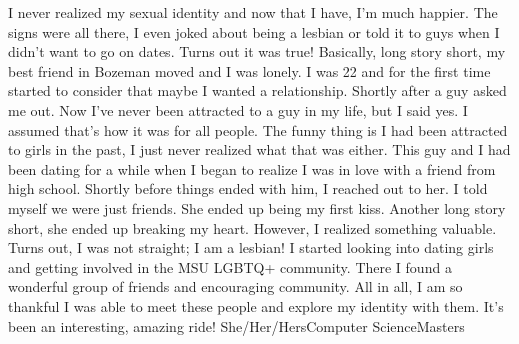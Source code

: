 {I never realized my sexual identity and now that I have, I’m much happier. 
The signs were all there, I even joked about being a lesbian or told it to 
guys when I didn’t want to go on dates. Turns out it was true! Basically, long 
story short, my best friend in Bozeman moved and I was lonely. I was 22 and for
the first time started to consider that maybe I wanted a relationship. Shortly 
after a guy asked me out. Now I’ve never been attracted to a guy in my life, 
but I said yes. I assumed that’s how it was for all people. The funny thing is 
I had been attracted to girls in the past, I just never realized what that was 
either. This guy and I had been dating for a while when I began to realize I 
was in love with a friend from high school. Shortly before things ended with 
him, I reached out to her. I told myself we were just friends. She ended up 
being my first kiss. Another long story short, she ended up breaking my heart. 
However, I realized something valuable. Turns out, I was not straight; I am a 
lesbian! I started looking into dating girls and getting involved in the MSU 
LGBTQ+ community. There I found a wonderful group of friends and encouraging 
community. All in all, I am so thankful I was able to meet these people and 
explore my identity with them. It’s been an interesting, amazing ride!}
{She/Her/Hers}{Computer Science}{Masters}
